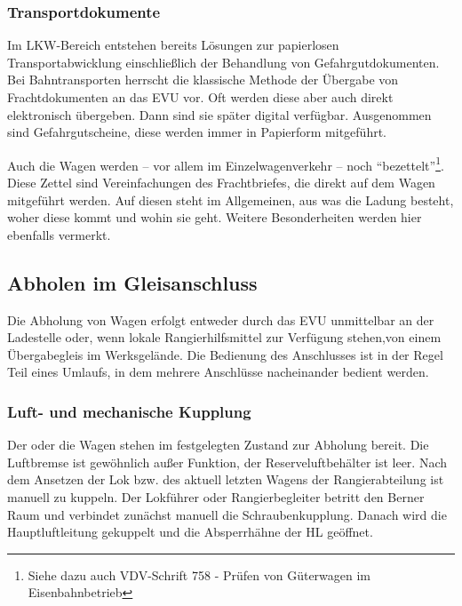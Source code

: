 \subsubsection{Transportdokumente}\label{sec:Transdoc}
Im LKW-Bereich entstehen bereits Lösungen zur papierlosen Transportabwicklung einschließlich der Behandlung von Gefahrgutdokumenten. Bei Bahntransporten herrscht die klassische Methode der Übergabe von Frachtdokumenten an das \acrshort{EVU} vor. Oft werden diese aber auch direkt elektronisch übergeben. Dann sind sie später digital verfügbar. Ausgenommen sind Gefahrgutscheine, diese werden immer in Papierform mitgeführt.\par
Auch die Wagen werden -- vor allem im Einzelwagenverkehr -- noch "`bezettelt"'\footnote{Siehe dazu auch VDV-Schrift 758 - Prüfen von Güterwagen im Eisenbahnbetrieb}. Diese Zettel sind Vereinfachungen des Frachtbriefes, die direkt auf dem Wagen mitgeführt werden. Auf diesen steht im Allgemeinen, aus was die Ladung besteht, woher diese kommt und wohin sie geht. Weitere Besonderheiten werden hier ebenfalls vermerkt.
\subsection{Abholen im Gleisanschluss}
Die Abholung von Wagen erfolgt entweder durch das \acrshort{EVU} unmittelbar an der Ladestelle oder, wenn lokale Rangierhilfsmittel zur Verfügung stehen,von einem Übergabegleis im Werksgelände. Die Bedienung des Anschlusses ist in der Regel Teil eines Umlaufs, in dem mehrere Anschlüsse nacheinander bedient werden.
\subsubsection{Luft- und mechanische Kupplung}\label{sec:LuftumechKup}
Der oder die Wagen stehen im festgelegten Zustand zur Abholung bereit. Die Luftbremse ist gewöhnlich außer Funktion, der Reserveluftbehälter ist leer. Nach dem Ansetzen der Lok bzw. des aktuell letzten Wagens der Rangierabteilung ist manuell zu kuppeln. Der Lokführer oder Rangierbegleiter betritt den Berner Raum und verbindet zunächst manuell die Schraubenkupplung. Danach wird die Hauptluftleitung gekuppelt und die Absperrhähne der \acrshort{HL} geöffnet. %
